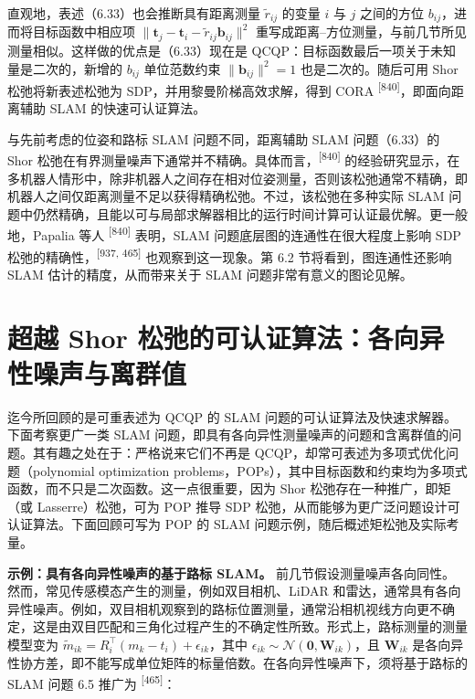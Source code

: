直观地，表述（6.33）也会推断具有距离测量 $\tilde { r } _ { i j }$ 的变量 $i$ 与 $j$ 之间的方位 $b _ { i j }$，进而将目标函数中相应项 $\| \pmb { t } _ { j } - \pmb { t } _ { i } - \tilde { r } _ { i j } \pmb { b } _ { i j } \| ^ { 2}$ 重写成距离--方位测量，与前几节所见测量相似。这样做的优点是（6.33）现在是 QCQP：目标函数最后一项关于未知量是二次的，新增的 $b _ { i j }$ 单位范数约束 $\| \pmb { b } _ { i j } \| ^ { 2 } = 1$ 也是二次的。随后可用 Shor 松弛将新表述松弛为 SDP，并用黎曼阶梯高效求解，得到 CORA \textsuperscript{[840]}，即面向距离辅助 SLAM 的快速可认证算法。

与先前考虑的位姿和路标 SLAM 问题不同，距离辅助 SLAM 问题（6.33）的 Shor 松弛在有界测量噪声下通常并不精确。具体而言，\textsuperscript{[840]} 的经验研究显示，在多机器人情形中，除非机器人之间存在相对位姿测量，否则该松弛通常不精确，即机器人之间仅距离测量不足以获得精确松弛。不过，该松弛在多种实际 SLAM 问题中仍然精确，且能以可与局部求解器相比的运行时间计算可认证最优解。更一般地，Papalia 等人 \textsuperscript{[840]} 表明，SLAM 问题底层图的连通性在很大程度上影响 SDP 松弛的精确性，\textsuperscript{[937, 465]} 也观察到这一现象。第 6.2 节将看到，图连通性还影响 SLAM 估计的精度，从而带来关于 SLAM 问题非常有意义的图论见解。

\section{超越 Shor 松弛的可认证算法：各向异性噪声与离群值}

迄今所回顾的是可重表述为 QCQP 的 SLAM 问题的可认证算法及快速求解器。下面考察更广一类 SLAM 问题，即具有各向异性测量噪声的问题和含离群值的问题。其有趣之处在于：严格说来它们不再是 QCQP，却常可表述为多项式优化问题（polynomial optimization problems，POPs），其中目标函数和约束均为多项式函数，而不只是二次函数。这一点很重要，因为 Shor 松弛存在一种推广，即矩（或 Lasserre）松弛，可为 POP 推导 SDP 松弛，从而能够为更广泛问题设计可认证算法。下面回顾可写为 POP 的 SLAM 问题示例，随后概述矩松弛及实际考量。

\textbf{示例：具有各向异性噪声的基于路标 SLAM。} 前几节假设测量噪声各向同性。然而，常见传感模态产生的测量，例如双目相机、LiDAR 和雷达，通常具有各向异性噪声。例如，双目相机观察到的路标位置测量，通常沿相机视线方向更不确定，这是由双目匹配和三角化过程产生的不确定性所致。形式上，路标测量的测量模型变为 $\tilde { m } _ { i k } = R _ { i } ^ { \top } ( m _ { k } - t _ { i } ) + \epsilon _ { i k }$，其中 $\epsilon _ { i k } \sim \mathcal { N } ( \mathbf { 0 } , \mathbf { W } _ { i k } )$，且 $\mathbf { W } _ { i k }$ 是各向异性协方差，即不能写成单位矩阵的标量倍数。在各向异性噪声下，须将基于路标的 SLAM 问题 6.5 推广为 \textsuperscript{[465]}：

